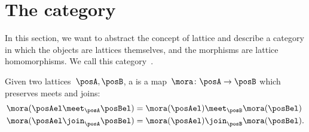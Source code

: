 \section[The category \Lat]{The category~\Lat}
In this section, we want to abstract the concept of lattice and describe a category in which the objects are lattices themselves, and the morphisms are lattice homomorphisms.
We call this category~\Lat.

\begin{ctdefinition}
	\label{def:lattice_homomorphism}
	Given two lattices~$\posA, \posB$, a \emph{} is a map~$\mora\colon \posA\to \posB$ which preserves meets and joins:
	\begin{equation}
		\begin{aligned}
			\mora(\posAel \meet_\posA \posBel) & = \mora(\posAel) \meet_\posB \mora(\posBel)  \\
			\mora(\posAel \join_\posA \posBel) & = \mora(\posAel) \join_\posB \mora(\posBel).
		\end{aligned}
	\end{equation}
\end{ctdefinition}

